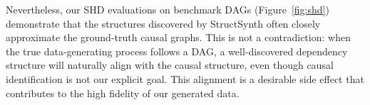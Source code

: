Nevertheless, our SHD evaluations on benchmark DAGs (Figure~\ref{fig:shd}) demonstrate that the structures discovered by StructSynth often closely approximate the ground-truth causal graphs. This is not a contradiction: when the true data-generating process follows a DAG, a well-discovered dependency structure will naturally align with the causal structure, even though causal identification is not our explicit goal. This alignment is a desirable side effect that contributes to the high fidelity of our generated data.

